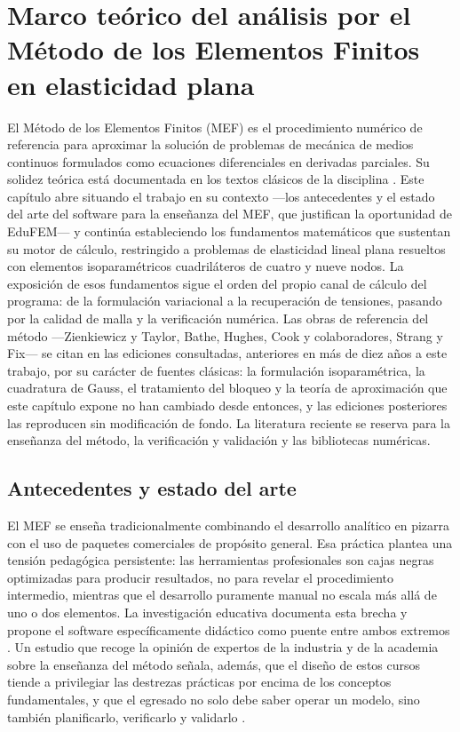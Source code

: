\chapter{Marco teórico del análisis por el Método de los Elementos Finitos en elasticidad plana}
\label{cap:marco_teorico}

El Método de los Elementos Finitos (MEF) es el procedimiento numérico de referencia para aproximar la solución de problemas de mecánica de medios continuos formulados como ecuaciones diferenciales en derivadas parciales. Su solidez teórica está documentada en los textos clásicos de la disciplina \autocite{zienkiewicz2013fem,bathe2014fem,cook2002concepts}. Este capítulo abre situando el trabajo en su contexto —los antecedentes y el estado del arte del software para la enseñanza del MEF, que justifican la oportunidad de EduFEM— y continúa estableciendo los fundamentos matemáticos que sustentan su motor de cálculo, restringido a problemas de elasticidad lineal plana resueltos con elementos isoparamétricos cuadriláteros de cuatro y nueve nodos. La exposición de esos fundamentos sigue el orden del propio canal de cálculo del programa: de la formulación variacional a la recuperación de tensiones, pasando por la calidad de malla y la verificación numérica. Las obras de referencia del método —Zienkiewicz y Taylor, Bathe, Hughes, Cook y colaboradores, Strang y Fix— se citan en las ediciones consultadas, anteriores en más de diez años a este trabajo, por su carácter de fuentes clásicas: la formulación isoparamétrica, la cuadratura de Gauss, el tratamiento del bloqueo y la teoría de aproximación que este capítulo expone no han cambiado desde entonces, y las ediciones posteriores las reproducen sin modificación de fondo. La literatura reciente se reserva para la enseñanza del método, la verificación y validación y las bibliotecas numéricas.

\section{Antecedentes y estado del arte}
\label{sec:antecedentes}

El MEF se enseña tradicionalmente combinando el desarrollo analítico en pizarra con el uso de paquetes comerciales de propósito general. Esa práctica plantea una tensión pedagógica persistente: las herramientas profesionales son cajas negras optimizadas para producir resultados, no para revelar el procedimiento intermedio, mientras que el desarrollo puramente manual no escala más allá de uno o dos elementos. La investigación educativa documenta esta brecha y propone el software específicamente didáctico como puente entre ambos extremos \autocite{bishay2020teaching,lee2015interactive,perezsantiago2023fem}. Un estudio que recoge la opinión de expertos de la industria y de la academia sobre la enseñanza del método señala, además, que el diseño de estos cursos tiende a privilegiar las destrezas prácticas por encima de los conceptos fundamentales, y que el egresado no solo debe saber operar un modelo, sino también planificarlo, verificarlo y validarlo \autocite[p.~1159]{perezsantiago2023fem}.


